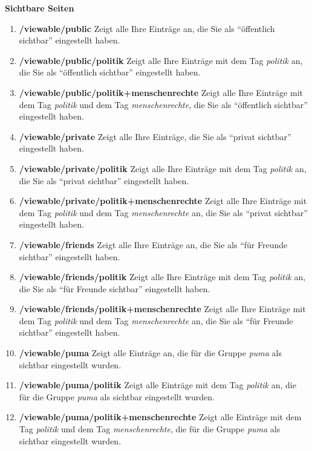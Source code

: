 \textbf{Sichtbare Seiten}
\begin{enumerate}
    \item \textbf{/viewable/public} \newline
    Zeigt alle Ihre Einträge an, die Sie als \enquote{öffentlich sichtbar} eingestellt haben.
    \item \textbf{/viewable/public/politik} \newline
    Zeigt alle Ihre Einträge mit dem Tag \textit{politik} an, die Sie als \enquote{öffentlich sichtbar} eingestellt haben.
    \item \textbf{/viewable/public/politik+menschenrechte} \newline
    Zeigt alle Ihre Einträge mit dem Tag \textit{politik} und dem Tag \textit{menschenrechte}, die Sie als \enquote{öffentlich sichtbar} eingestellt haben.
    \item \textbf{/viewable/private} \newline
    Zeigt alle Ihre Einträge, die Sie als \enquote{privat sichtbar} eingestellt haben.
    \item \textbf{/viewable/private/politik} \newline
    Zeigt alle Ihre Einträge mit dem Tag \textit{politik} an, die Sie als \enquote{privat sichtbar} eingestellt haben.
    \item \textbf{/viewable/private/politik+menschenrechte} \newline
    Zeigt alle Ihre Einträge mit dem Tag \textit{politik} und dem Tag \textit{menschenrechte} an, die Sie als \enquote{privat sichtbar} eingestellt haben.
    \item \textbf{/viewable/friends} \newline
    Zeigt alle Ihre Einträge an, die Sie als \enquote{für Freunde sichtbar} eingestellt haben.
    \item \textbf{/viewable/friends/politik} \newline
    Zeigt alle Ihre Einträge mit dem Tag \textit{politik} an, die Sie als \enquote{für Freunde sichtbar} eingestellt haben.
    \item \textbf{/viewable/friends/politik+menschenrechte} \newline
    Zeigt alle Ihre Einträge mit dem Tag \textit{politik} und dem Tag \textit{menschenrechte} an, die Sie als \enquote{für Freunde sichtbar} eingestellt haben.
    \item \textbf{/viewable/puma} \newline
    Zeigt alle Einträge an, die für die Gruppe \textit{puma} als sichtbar eingestellt wurden.
    \item \textbf{/viewable/puma/politik} \newline
    Zeigt alle Einträge mit dem Tag \textit{politik} an, die für die Gruppe \textit{puma} als sichtbar eingestellt wurden.
    \item \textbf{/viewable/puma/politik+menschenrechte} \newline
    Zeigt alle Einträge mit dem Tag \textit{politik} und dem Tag \textit{menschenrechte}, die für die Gruppe \textit{puma} als sichtbar eingestellt wurden.
\end{enumerate}
